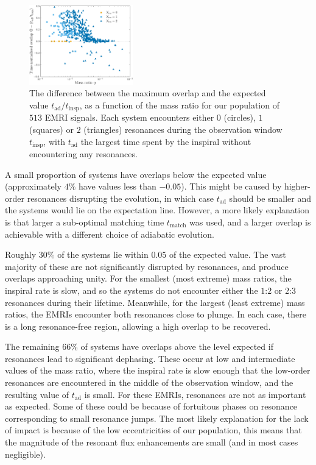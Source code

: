 \documentclass[aps,prd,amsfonts,amssymb,amsmath,nofootinbib,showpacs,superscriptaddress,twocolumn,floatfix]{revtex4-1}
\newcommand{\sub}[1]{\ensuremath{_\mathrm{#1}}}
\begin{document}
\begin{figure}
\centering
\includegraphics[width=0.4\textwidth]{Fig_res_overlap_t}
\caption{\label{fig:pop-adSNR-vs-eta}The difference between the maximum overlap and the expected value $t\sub{ad} / t\sub{insp}$, as a function of the mass ratio for our population of $513$ EMRI signals. Each system encounters either $0$ (circles), $1$ (squares) or $2$ (triangles) resonances during the observation window $t\sub{insp}$, with $t\sub{ad}$ the largest time spent by the inspiral without encountering any resonances.}
\end{figure}

A small proportion of systems have overlaps below the expected value (approximately $4\%$ have values less than $-0.05$). This might be caused by higher-order resonances disrupting the evolution, in which case $t\sub{ad}$ should be smaller and the systems would lie on the expectation line. However, a more likely explanation is that larger a sub-optimal matching time $t\sub{match}$ was used, and a larger overlap is achievable with a different choice of adiabatic evolution.

Roughly $30\%$ of the systems lie within $0.05$ of the expected value. The vast majority of these are not significantly disrupted by resonances, and produce overlaps approaching unity. For the smallest (most extreme) mass ratios, the inspiral rate is slow, and so the systems do not encounter either the $1$:$2$ or $2$:$3$ resonances during their lifetime. Meanwhile, for the largest (least extreme) mass ratios, the EMRIs encounter both resonances close to plunge. In each case, there is a long resonance-free region, allowing a high overlap to be recovered.

The remaining $66\%$ of systems have overlaps above the level expected if resonances lead to significant dephasing. These occur at low and intermediate values of the mass ratio, where the inspiral rate is slow enough that the low-order resonances are encountered in the middle of the observation window, and the resulting value of $t\sub{ad}$ is small. For these EMRIs, resonances are not as important as expected. Some of these could be because of fortuitous phases on resonance corresponding to small resonance jumps. The most likely explanation for the lack of impact is because of the low eccentricities of our population, this means that the magnitude of the resonant flux enhancements are small (and in most cases negligible).
\end{document}
